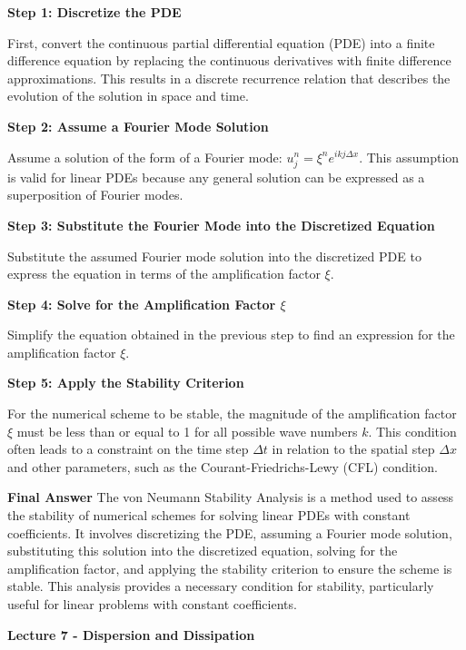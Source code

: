 \documentclass[10pt,a4paper]{report}
\begin{document}
\begin{description}

\item \textbf{Step 1: Discretize the PDE}

First, convert the continuous partial differential equation (PDE) into a finite difference equation by replacing the continuous derivatives with finite difference approximations. This results in a discrete recurrence relation that describes the evolution of the solution in space and time.

\item \textbf{Step 2: Assume a Fourier Mode Solution}

Assume a solution of the form of a Fourier mode: \( u_j^n = \xi^n e^{i k j \Delta x} \). This assumption is valid for linear PDEs because any general solution can be expressed as a superposition of Fourier modes.

\item \textbf{Step 3: Substitute the Fourier Mode into the Discretized Equation}

Substitute the assumed Fourier mode solution into the discretized PDE to express the equation in terms of the amplification factor \( \xi \).

\item \textbf{Step 4: Solve for the Amplification Factor \( \xi \)}

Simplify the equation obtained in the previous step to find an expression for the amplification factor \( \xi \).

\item \textbf{Step 5: Apply the Stability Criterion}

For the numerical scheme to be stable, the magnitude of the amplification factor \( \xi \) must be less than or equal to 1 for all possible wave numbers \( k \). This condition often leads to a constraint on the time step \( \Delta t \) in relation to the spatial step \( \Delta x \) and other parameters, such as the Courant-Friedrichs-Lewy (CFL) condition.

\item \textbf{Final Answer}
The von Neumann Stability Analysis is a method used to assess the stability of numerical schemes for solving linear PDEs with constant coefficients. It involves discretizing the PDE, assuming a Fourier mode solution, substituting this solution into the discretized equation, solving for the amplification factor, and applying the stability criterion to ensure the scheme is stable. This analysis provides a necessary condition for stability, particularly useful for linear problems with constant coefficients.
\end{description}
\newpage 
\textbf{\Large{Lecture 7 - Dispersion and Dissipation}}
\end{document}
